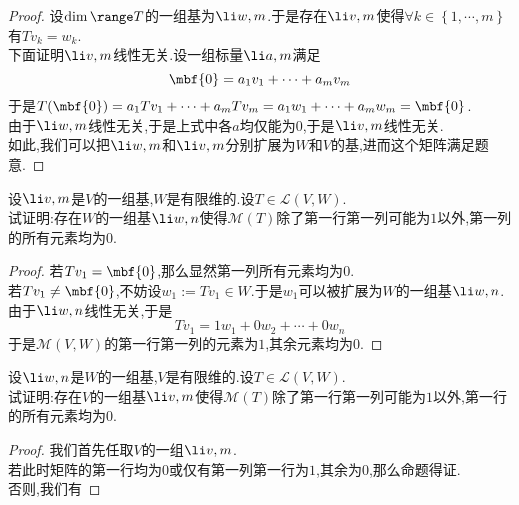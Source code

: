 \documentclass{ctexart}
\begin{document}
\begin{proof}
    设$\dim\range T$的一组基为$\li w,m$.于是存在$\li v,m$使得$\forall k\in\left\{1,\cdots,m\right\}$有$Tv_k=w_k$.\\
    下面证明$\li v,m$线性无关.设一组标量$\li a,m$满足
    $$\mbf{0}=a_1v_1+\cdots+a_mv_m$$
    于是$T(\mbf{0})=a_1Tv_1+\cdots+a_mTv_m=a_1w_1+\cdots+a_mw_m=\mbf{0}$.\\
    由于$\li w,m$线性无关,于是上式中各$a$均仅能为$0$,于是$\li v,m$线性无关.\\
    如此,我们可以把$\li w,m$和$\li v,m$分别扩展为$W$和$V$的基,进而这个矩阵满足题意.
\end{proof}
\begin{problem}[6.]
    设$\li v,m$是$V$的一组基,$W$是有限维的.设$T\in\mathcal{L}(V,W)$.\\
    试证明:存在$W$的一组基$\li w,n$使得$\mathcal{M}(T)$除了第一行第一列可能为$1$以外,第一列的所有元素均为$0$.
\end{problem}
\begin{proof}
    若$Tv_1=\mbf{0}$,那么显然第一列所有元素均为$0$.\\
    若$Tv_1\neq\mbf{0}$,不妨设$w_1:=Tv_1\in W$.于是$w_1$可以被扩展为$W$的一组基$\li w,n$.由于$\li w,n$线性无关,于是
    $$Tv_1=1w_1+0w_2+\cdots+0w_n$$
    于是$\mathcal{M}(V,W)$的第一行第一列的元素为$1$,其余元素均为$0$.
\end{proof}
\begin{problem}[7.]
    设$\li w,n$是$W$的一组基,$V$是有限维的.设$T\in\mathcal{L}(V,W)$.\\
    试证明:存在$V$的一组基$\li v,m$使得$\mathcal{M}(T)$除了第一行第一列可能为$1$以外,第一行的所有元素均为$0$.
\end{problem}
\begin{proof}
    我们首先任取$V$的一组$\li v,m$.\\
    若此时矩阵的第一行均为$0$或仅有第一列第一行为$1$,其余为$0$,那么命题得证.\\
    否则,我们有
\end{proof}
\end{document}
